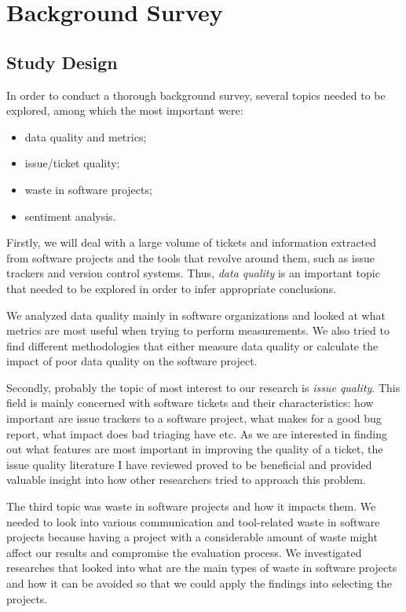 \documentclass{mprop}
\begin{document}


\section{Background Survey}

\subsection{Study Design}

In order to conduct a thorough background survey, several topics needed to be 
explored, among which the most important were:
  \begin{itemize}
    \item data quality and metrics;
    \item issue/ticket quality;
    \item waste in software projects;
    \item sentiment analysis.
  \end{itemize}

Firstly, we will deal with a large volume of tickets and information extracted 
from software projects and the tools that revolve around them, such as issue 
trackers and version control systems. Thus, \emph{data quality} is an important 
topic that needed to be explored in order to infer appropriate conclusions. 

We analyzed data quality mainly in software organizations and looked at what metrics
are most useful when trying to perform measurements. We also tried to find different
methodologies that either measure data quality or calculate the impact of poor data
quality on the software project. 

Secondly, probably the topic of most interest to our research is \emph{issue quality}.
This field is mainly concerned with software tickets and their characteristics: how
important are issue trackers to a software project, what makes for a good bug report,
what impact does bad triaging have etc. As we are interested in finding out what
features are most important in improving the quality of a ticket, the issue quality
literature I have reviewed proved to be beneficial and provided valuable insight into
how other researchers tried to approach this problem.

The third topic was waste in software projects and how it impacts them. We needed to
look into various communication and tool-related waste in software projects because
having a project with a considerable amount of waste might affect our results and
compromise the evaluation process. We investigated researches that looked into what
are the main types of waste in software projects and how it can be avoided so that
we could apply the findings into selecting the projects.
\end{document}
